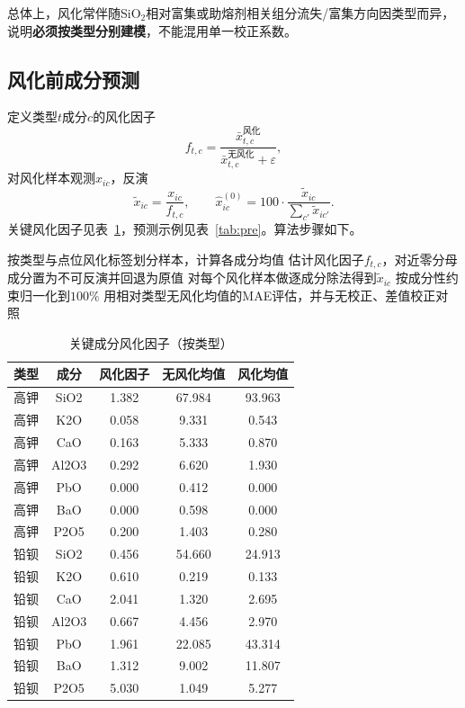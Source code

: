 \documentclass[UTF8,a4paper,12pt]{ctexart}
\begin{document}
总体上，风化常伴随SiO$_2$相对富集或助熔剂相关组分流失/富集方向因类型而异，说明\textbf{必须按类型分别建模}，不能混用单一校正系数。

\subsection{风化前成分预测}
定义类型$t$成分$c$的风化因子
\begin{equation}
f_{t,c}=\frac{\bar{x}_{t,c}^{\text{风化}}}{\bar{x}_{t,c}^{\text{无风化}}+\varepsilon},
\end{equation}
对风化样本观测$x_{ic}$，反演
\begin{equation}
\tilde{x}_{ic}=\frac{x_{ic}}{f_{t,c}},\qquad
\hat{x}_{ic}^{(0)}=100\cdot\frac{\tilde{x}_{ic}}{\sum_{c'}\tilde{x}_{ic'}}.
\end{equation}
关键风化因子见表~\ref{tab:fac}，预测示例见表~\ref{tab:pre}。算法步骤如下。

\begin{algorithm}[H]
\caption{类型条件风化因子反演}
\begin{algorithmic}[1]
\State 按类型与点位风化标签划分样本，计算各成分均值
\State 估计风化因子$f_{t,c}$，对近零分母成分置为不可反演并回退为原值
\State 对每个风化样本做逐成分除法得到$\tilde{x}_{ic}$
\State 按成分性约束归一化到$100\%$
\State 用相对类型无风化均值的MAE评估，并与无校正、差值校正对照
\end{algorithmic}
\end{algorithm}

\begin{table}[H]
\centering
\caption{关键成分风化因子（按类型）}
\label{tab:fac}
\scriptsize
\begin{tabular}{lcccc}
\toprule
类型 & 成分 & 风化因子 & 无风化均值 & 风化均值 \\
\hline
高钾 & SiO2 & 1.382 & 67.984 & 93.963 \\
高钾 & K2O & 0.058 & 9.331 & 0.543 \\
高钾 & CaO & 0.163 & 5.333 & 0.870 \\
高钾 & Al2O3 & 0.292 & 6.620 & 1.930 \\
高钾 & PbO & 0.000 & 0.412 & 0.000 \\
高钾 & BaO & 0.000 & 0.598 & 0.000 \\
高钾 & P2O5 & 0.200 & 1.403 & 0.280 \\
铅钡 & SiO2 & 0.456 & 54.660 & 24.913 \\
铅钡 & K2O & 0.610 & 0.219 & 0.133 \\
铅钡 & CaO & 2.041 & 1.320 & 2.695 \\
铅钡 & Al2O3 & 0.667 & 4.456 & 2.970 \\
铅钡 & PbO & 1.961 & 22.085 & 43.314 \\
铅钡 & BaO & 1.312 & 9.002 & 11.807 \\
铅钡 & P2O5 & 5.030 & 1.049 & 5.277 \\
\bottomrule
\end{tabular}
\end{table}
\end{document}
